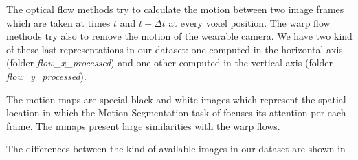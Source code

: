 \documentclass[10pt,twocolumn,hidelinks,letterpaper]{article}
\begin{document}
The optical flow methods try to calculate the motion between two image frames which are taken at times $t$ and $t + \Delta t$ at every voxel position. The warp flow methods try also to remove the motion of the wearable camera. We have two kind of these last representations in our dataset: one computed in the horizontal axis (folder \textit{flow\_x\_processed}) and one other computed in the vertical axis (folder \textit{flow\_y\_processed}).

The motion maps are special black-and-white images which represent the spatial location in which the Motion Segmentation task of \cite{sparnet} focuses its attention per each frame. The mmaps present large similarities with the warp flows.

The differences between the kind of available images in our dataset are shown in .
\end{document}
